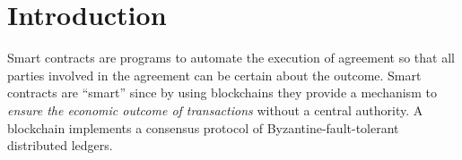 \documentclass[acmsmall,review,anonymous]{acmart}\settopmatter{printfolios=true,printccs=false,printacmref=false}
\begin{document}




\maketitle


\section{Introduction}




Smart contracts are programs to automate the execution of agreement so that all
parties involved in the agreement can be certain about the outcome.
Smart contracts are ``smart'' since by using blockchains they provide a
mechanism to \emph{ensure the economic outcome of transactions} without a
central authority.
A blockchain implements a consensus protocol of Byzantine-fault-tolerant
distributed ledgers.
\end{document}

